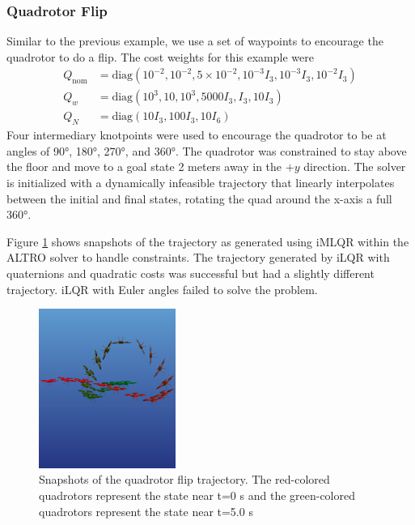 \documentclass[letterpaper, 10 pt, conference]{ieeeconf}  %
\begin{document}
        \subsubsection{Quadrotor Flip}
	    Similar to the previous example, we use a set of waypoints to encourage the
	    quadrotor to do a flip. The cost weights for this example were
	    \begin{align*}
	        Q_\text{nom} &= \text{diag}(10^{-2},10^{-2},5 \!\times\! 10^{-2}, 10^{-3} I_3,
    	        10^{-3} I_3, 10^{-2} I_3) \\
	        Q_w &= \text{diag}(10^3, 10, 10^3, 5000 I_3, I_3, 10 I_3) \\
	        Q_N &= \text{diag}(10 I_3, 100 I_3, 10 I_6)  
	    \end{align*}
	    Four intermediary knotpoints were used to encourage the quadrotor to be at angles
	    of \ang{90}, \ang{180}, \ang{270}, and \ang{360}. The quadrotor was constrained
	    to stay above the floor and move to a goal state 2 meters away in the $+y$
	    direction. The solver is initialized with a dynamically infeasible trajectory
	    that linearly interpolates between the initial and final states, rotating the
	    quad around the x-axis a full \ang{360}.
	    
	    Figure \ref{fig:quad_flip} shows snapshots of the trajectory as generated using
	    iMLQR within the ALTRO solver to handle constraints. The trajectory generated by
	    iLQR with quaternions and quadratic costs was successful but had a slightly
        different trajectory. iLQR with Euler angles failed to solve the problem.

            \begin{figure}[t]
                \centering
                \includegraphics[height=5.2cm,trim={0 3cm 0 0},clip]{figures/quad_flip.png}
                \caption{Snapshots of the quadrotor flip trajectory. The
                    red-colored quadrotors represent the state near t=0 s and the
                    green-colored quadrotors represent the state near t=5.0 s
                }
                \label{fig:quad_flip}
            \end{figure}    
\end{document}
